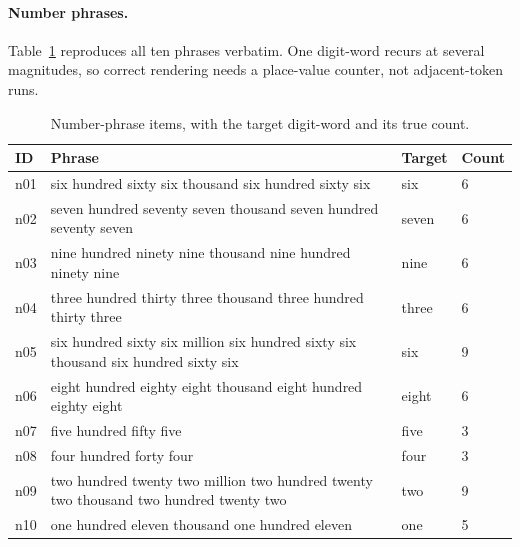 \paragraph{Number phrases.} Table~\ref{tab:numbers} reproduces all ten
phrases verbatim. One digit-word recurs at several magnitudes, so correct
rendering needs a place-value counter, not adjacent-token runs.
\begin{table}[tp]
\centering
\caption{Number-phrase items, with the target digit-word and its true count.}
\label{tab:numbers}
\small
\begin{tabular}{@{}lp{12.3cm}ll@{}}
\toprule
ID & Phrase & Target & Count \\
\midrule
n01 & six hundred sixty six thousand six hundred sixty six & six & 6 \\
n02 & seven hundred seventy seven thousand seven hundred seventy seven & seven & 6 \\
n03 & nine hundred ninety nine thousand nine hundred ninety nine & nine & 6 \\
n04 & three hundred thirty three thousand three hundred thirty three & three & 6 \\
n05 & six hundred sixty six million six hundred sixty six thousand six hundred sixty six & six & 9 \\
n06 & eight hundred eighty eight thousand eight hundred eighty eight & eight & 6 \\
n07 & five hundred fifty five & five & 3 \\
n08 & four hundred forty four & four & 3 \\
n09 & two hundred twenty two million two hundred twenty two thousand two hundred twenty two & two & 9 \\
n10 & one hundred eleven thousand one hundred eleven & one & 5 \\
\bottomrule
\end{tabular}
\end{table}

